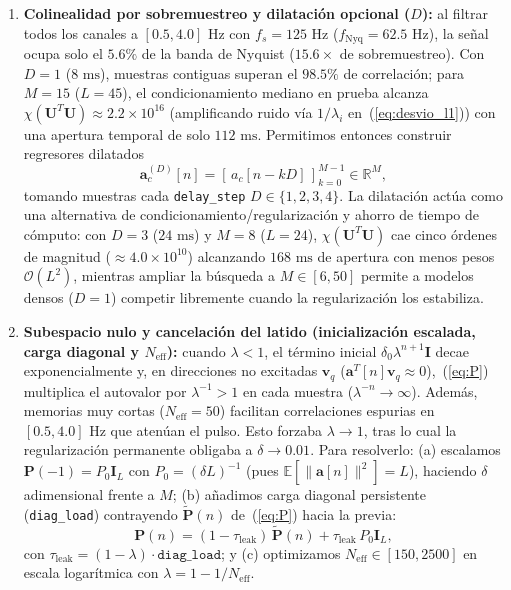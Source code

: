 \documentclass[conference]{IEEEtran}
\begin{document}
\begin{enumerate}
    \item \textbf{Colinealidad por sobremuestreo y dilatación opcional ($D$):} al filtrar todos los canales a $[0.5,4.0]\text{ Hz}$ con $f_s=125\text{ Hz}$ ($f_{\text{Nyq}}=62.5\text{ Hz}$), la señal ocupa solo el $5.6\%$ de la banda de Nyquist ($15.6\times$ de sobremuestreo). Con $D=1$ ($8\text{ ms}$), muestras contiguas superan el $98.5\%$ de correlación; para $M=15$ ($L=45$), el condicionamiento mediano en prueba alcanza $\chi(\mathbf{U}^T\mathbf{U})\approx 2.2\times 10^{16}$ (amplificando ruido vía $1/\lambda_i$ en~(\ref{eq:desvio_l1})) con una apertura temporal de solo $112\text{ ms}$. Permitimos entonces construir regresores dilatados
    \begin{equation}
    \mathbf{a}_c^{(D)}[n]=[\,a_c[n{-}kD]\,]_{k=0}^{M-1}\in\mathbb{R}^M,
    \label{eq:dilated}
    \end{equation}
    tomando muestras cada \texttt{delay\_step} $D\in\{1,2,3,4\}$. La dilatación actúa como una alternativa de condicionamiento/regularización y ahorro de tiempo de cómputo: con $D=3$ ($24\text{ ms}$) y $M=8$ ($L=24$), $\chi(\mathbf{U}^T\mathbf{U})$ cae cinco órdenes de magnitud ($\approx 4.0\times 10^{10}$) alcanzando $168\text{ ms}$ de apertura con menos pesos $\mathcal{O}(L^2)$, mientras ampliar la búsqueda a $M\in[6,50]$ permite a modelos densos ($D=1$) competir libremente cuando la regularización los estabiliza.

    \item \textbf{Subespacio nulo y cancelación del latido (inicialización escalada, carga diagonal y $N_{\text{eff}}$):} cuando $\lambda<1$, el término inicial $\delta_0\lambda^{n+1}\mathbf{I}$ decae exponencialmente y, en direcciones no excitadas $\mathbf{v}_q$ ($\mathbf{a}^T[n]\mathbf{v}_q\approx 0$),~(\ref{eq:P}) multiplica el autovalor por $\lambda^{-1}>1$ en cada muestra ($\lambda^{-n}\to\infty$). Además, memorias muy cortas ($N_{\text{eff}}=50$) facilitan correlaciones espurias en $[0.5,4.0]\text{ Hz}$ que atenúan el pulso. Esto forzaba $\lambda\to 1$, tras lo cual la regularización permanente obligaba a $\delta\to 0.01$. Para resolverlo: (a) escalamos $\mathbf{P}(-1)=P_0\mathbf{I}_L$ con $P_0=(\delta L)^{-1}$ (pues $\mathbb{E}[\lVert\mathbf{a}[n]\rVert^2]=L$), haciendo $\delta$ adimensional frente a $M$; (b) añadimos carga diagonal persistente (\texttt{diag\_load}) contrayendo $\tilde{\mathbf{P}}(n)$ de~(\ref{eq:P}) hacia la previa:
    \begin{equation}
    \mathbf{P}(n)=(1-\tau_{\text{leak}})\,\tilde{\mathbf{P}}(n)+\tau_{\text{leak}}\,P_0\mathbf{I}_L,
    \label{eq:diag_load}
    \end{equation}
    con $\tau_{\text{leak}}=(1-\lambda)\cdot\texttt{diag\_load}$; y (c) optimizamos $N_{\text{eff}}\in[150,2500]$ en escala logarítmica con $\lambda=1-1/N_{\text{eff}}$.


\end{enumerate}
\end{document}
